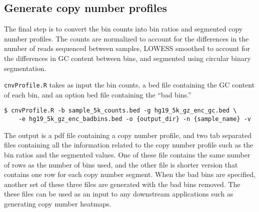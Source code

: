 \documentclass[11pt]{article}
\newcommand{\prog}[1]{\texttt{#1}}
\begin{document}
\subsection{Generate copy number profiles}
The final step is to convert the bin counts into bin ratios and segmented
copy number profiles. The counts are normalized to account for the
differences in the number of reads sequenced between samples, LOWESS
smoothed to account for the differences in GC content between bins, and
segmented using circular binary segmentation.

\prog{cnvProfile.R} takes as input the bin counts, a bed file containing
the GC content of each bin, and an option bed file containing the ``bad
bins.''
\begin{verbatim}
$ cnvProfile.R -b sample_5k_counts.bed -g hg19_5k_gz_enc_gc.bed \
    -e hg19_5k_gz_enc_badbins.bed -o {output_dir} -n {sample_name} -v
\end{verbatim}

The output is a pdf file containing a copy number profile, and two tab
separated files containing all the information related to the copy number
profile such as the bin ratios and the segmented values. One of these
file contains the same number of rows as the number of bins used, and
the other file is shorter version that contains one row for each copy
number segment. When the bad bins are specified, another set of these
three files are generated with the bad bins removed.
%
The these files can be used as an input to any downstream
applications such as generating copy number heatmaps.






\end{document}
